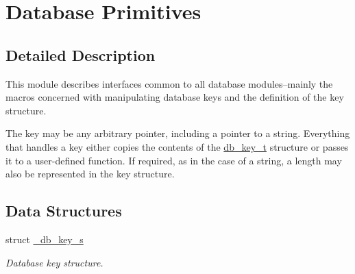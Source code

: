 \hypertarget{group__dbprim}{
\section{Database Primitives}
\label{group__dbprim}
}


\subsection{Detailed Description}
This module describes interfaces common to all database modules--mainly the macros concerned with manipulating database keys and the definition of the key structure.

The key may be any arbitrary pointer, including a pointer to a string. Everything that handles a key either copies the contents of the \hyperlink{group__dbprim_ga0}{db\_\-key\_\-t} structure or passes it to a user-defined function. If required, as in the case of a string, a length may also be represented in the key structure.

\subsection*{Data Structures}
\begin{CompactItemize}
\item 
struct \hyperlink{struct__db__key__s}{\_\-db\_\-key\_\-s}
\begin{CompactList}\small\item\em Database key structure. \item\end{CompactList}\end{CompactItemize}
